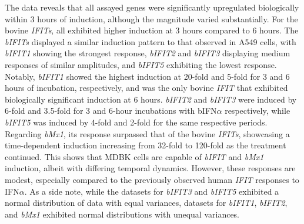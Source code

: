 The data reveals that all assayed genes were significantly upregulated biologically within 3 hours of induction, although the magnitude varied substantially. For the bovine \textit{IFITs}, all exhibited higher induction at 3 hours compared to 6 hours. The \textit{bIFITs} displayed a similar induction pattern to that observed in A549 cells, with \textit{bIFIT1} showing the strongest response, \textit{bIFIT2} and \textit{bIFIT3} displaying medium responses of similar amplitudes, and \textit{bIFIT5} exhibiting the lowest response. Notably, \textit{bIFIT1} showed the highest induction at 20-fold and 5-fold for 3 and 6 hours of incubation, respectively, and was the only bovine \textit{IFIT} that exhibited biologically significant induction at 6 hours. \textit{bIFIT2} and \textit{bIFIT3} were induced by 6-fold and 3.5-fold for 3 and 6-hour incubations with bIFN\(\alpha\) respectively, while \textit{bIFIT5} was induced by 4-fold and 2-fold for the same respective periods. Regarding \textit{bMx1}, its response surpassed that of the bovine \textit{IFITs}, showcasing a time-dependent induction increasing from 32-fold to 120-fold as the treatment continued. This shows that MDBK cells are capable of \textit{bIFIT} and \textit{bMx1} induction, albeit with differing temporal dynamics. However, these responses are modest, especially compared to the previously observed human \textit{IFIT} responses to IFN\(\alpha\). As a side note, while the datasets for \textit{bIFIT3} and \textit{bIFIT5} exhibited a normal distribution of data with equal variances, datasets for \textit{bIFIT1}, \textit{bIFIT2}, and \textit{bMx1} exhibited normal distributions with unequal variances.

